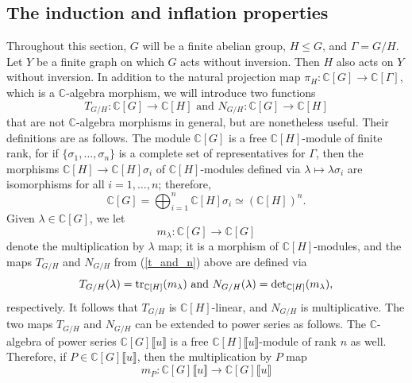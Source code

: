 \documentclass[11pt]{amsart}
\numberwithin{equation}{section}
\theoremstyle{remark}
\theoremstyle{definition}
\begin{document}
\subsection{The induction and inflation properties} \label{ind_inf}
Throughout this section, $G$ will be a finite abelian group, $H \le G$, and $\Gamma = G/H$.  Let $Y$ be a finite graph on which $G$ acts without inversion.  Then $H$ also acts on $Y$ without inversion.  In addition to the natural projection map $\pi_{H}:\mathbb{C}[G] \rightarrow \mathbb{C}[\Gamma]$, which is a $\mathbb{C}$-algebra morphism, we will introduce two functions
\begin{equation} \label{t_and_n}
T_{G/H}:\mathbb{C}[G] \rightarrow \mathbb{C}[H] \text{ and } N_{G/H}:\mathbb{C}[G] \rightarrow \mathbb{C}[H] 
\end{equation}
that are not $\mathbb{C}$-algebra morphisms in general, but are nonetheless useful.  Their definitions are as follows.  The module $\mathbb{C}[G]$ is a free $\mathbb{C}[H]$-module of finite rank, for if $\{\sigma_{1},\ldots,\sigma_{n}\}$ is a complete set of representatives for $\Gamma$, then the morphisms $\mathbb{C}[H] \rightarrow \mathbb{C}[H] \sigma_{i}$ of $\mathbb{C}[H]$-modules defined via $\lambda \mapsto \lambda \sigma_{i}$ are isomorphisms for all $i=1,\ldots,n$; therefore,
$$\mathbb{C}[G] = \bigoplus_{i=1}^{n}\mathbb{C}[H] \sigma_{i} \simeq (\mathbb{C}[H])^{n}. $$
Given $\lambda \in \mathbb{C}[G]$, we let 
$$m_{\lambda}:\mathbb{C}[G] \rightarrow \mathbb{C}[G]$$ 
denote the multiplication by $\lambda$ map; it is a morphism of $\mathbb{C}[H]$-modules, and the maps $T_{G/H}$ and $N_{G/H}$ from (\ref{t_and_n}) above are defined via
$$T_{G/H}(\lambda) = {\rm tr}_{\mathbb{C}[H]}(m_{\lambda}) \text{ and } N_{G/H}(\lambda) = {\rm det}_{\mathbb{C}[H]}(m_{\lambda}), $$
respectively.  It follows that $T_{G/H}$ is $\mathbb{C}[H]$-linear, and $N_{G/H}$ is multiplicative.  The two maps $T_{G/H}$ and $N_{G/H}$ can be extended to power series as follows.  The $\mathbb{C}$-algebra of power series $\mathbb{C}[G]\llbracket u \rrbracket$ is a free $\mathbb{C}[H]\llbracket u \rrbracket$-module of rank $n$ as well.  Therefore, if $P \in \mathbb{C}[G] \llbracket u \rrbracket$, then the multiplication by $P$ map 
\begin{equation} \label{mult_ps}
m_{P}:\mathbb{C}[G]\llbracket u \rrbracket \rightarrow \mathbb{C}[G]\llbracket u \rrbracket
\end{equation}
\end{document}
